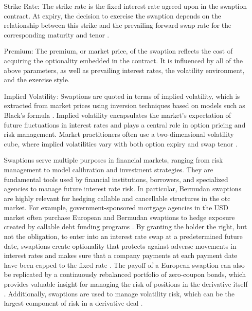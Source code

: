 Strike Rate: The strike rate is the fixed interest rate agreed upon in the swaption contract. At expiry, the decision to exercise the swaption depends on the relationship between this strike and the prevailing forward swap rate for the corresponding maturity and tenor \parencite[p.~239]{brigo2006interest}.

Premium: The premium, or market price, of the swaption reflects the cost of acquiring the optionality embedded in the contract. It is influenced by all of the above parameters, as well as prevailing interest rates, the volatility environment, and the exercise style.

Implied Volatility: Swaptions are quoted in terms of implied volatility, which is extracted from market prices using inversion techniques based on models such as Black's formula \parencite[p.~3]{hohmann2015newnormal}. Implied volatility encapsulates the market's expectation of future fluctuations in interest rates and plays a central role in option pricing and risk management. Market practitioners often use a two-dimensional volatility cube, where implied volatilities vary with both option expiry and swap tenor \parencite[p.~1]{suo2009volatility}.

Swaptions serve multiple purposes in financial markets, ranging from risk management to model calibration and investment strategies. They are fundamental tools used by financial institutions, borrowers, and specialized agencies to manage future interest rate risk. In particular, Bermudan swaptions are highly relevant for hedging callable and cancellable structures in the \ac{otc} market. For example, government-sponsored mortgage agencies in the USD market often purchase European and Bermudan swaptions to hedge exposure created by callable debt funding programs \parencite[p.~22]{rebonato2004interest}. By granting the holder the right, but not the obligation, to enter into an interest rate swap at a predetermined future date, swaptions create optionality that protects against adverse movements in interest rates and makes sure that a company payments at each payment date have been capped to the fixed rate \parencite[p.~17]{brigo2006interest}. The payoff of a European swaption can also be replicated by a continuously rebalanced portfolio of zero-coupon bonds, which provides valuable insight for managing the risk of positions in the derivative itself \parencite[p.~241]{brigo2006interest}. Additionally, swaptions are used to manage volatility risk, which can be the largest component of risk in a derivative deal \parencite[p.~242]{brigo2006interest}.

